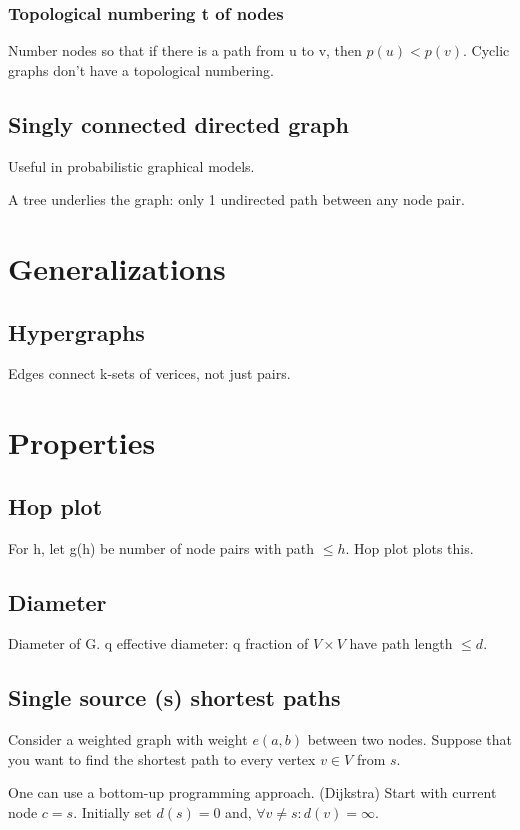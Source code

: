 \documentclass[oneside, article]{memoir}
\begin{document}
\subsubsection{Topological numbering t of nodes}
Number nodes so that if there is a path from u to v, then $p(u)< p(v)$. Cyclic graphs don't have a topological numbering.

\subsection{Singly connected directed graph}
Useful in probabilistic graphical models.

A tree underlies the graph: only 1 undirected path between any node pair.

\section{Generalizations}
\subsection{Hypergraphs}
Edges connect k-sets of verices, not just pairs.

\section{Properties}
\subsection{Hop plot}
For h, let g(h) be number of node pairs with path $\leq h$. Hop plot plots this.

\subsection{Diameter}
Diameter of G. q effective diameter: q fraction of $V\times V$ have path length $\leq d$.

\subsection{Single source (s) shortest paths}
Consider a weighted graph with weight $e(a, b)$ between two nodes. Suppose that you want to find the shortest path to every vertex $v \in V$ from $s$.

One can use a bottom-up programming approach. (Dijkstra) Start with current node $c = s$. Initially set $d(s) = 0$ and, $ \forall v \neq s : d(v) = \infty$.
\end{document}
